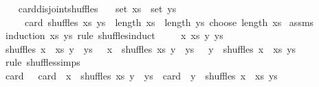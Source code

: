 \begin{isabellebody}
\ \ \isamarkupfalse%
\isanewline
{}\isamarkupfalse%
%
\endisatagproof
{\isafoldproof}%
%
\isadelimproof
\isanewline
%
\endisadelimproof
\isanewline
{}\isamarkupfalse%
\ card{\isacharunderscore}{\kern0pt}disjoint{\isacharunderscore}{\kern0pt}shuffles{\isacharcolon}{\kern0pt}\isanewline
\ \ \ {\isachardoublequoteopen}set\ xs\ {\isasyminter}\ set\ ys\ {\isacharequal}{\kern0pt}\ {\isacharbraceleft}{\kern0pt}{\isacharbraceright}{\kern0pt}{\isachardoublequoteclose}\isanewline
\ \ \ \ \ {\isachardoublequoteopen}card\ {\isacharparenleft}{\kern0pt}shuffles\ xs\ ys{\isacharparenright}{\kern0pt}\ {\isacharequal}{\kern0pt}\ {\isacharparenleft}{\kern0pt}length\ xs\ {\isacharplus}{\kern0pt}\ length\ ys{\isacharparenright}{\kern0pt}\ choose\ length\ xs{\isachardoublequoteclose}\isanewline
%
\isadelimproof
%
\endisadelimproof
%
\isatagproof
{}\isamarkupfalse%
\ assms\isanewline
{}\isamarkupfalse%
\ {\isacharparenleft}{\kern0pt}induction\ xs\ ys\ rule{\isacharcolon}{\kern0pt}\ shuffles{\isachardot}{\kern0pt}induct{\isacharparenright}{\kern0pt}\isanewline
\ \ \isamarkupfalse%
\ {\isacharparenleft}{\kern0pt}{}\ x\ xs\ y\ ys{\isacharparenright}{\kern0pt}\isanewline
\ \ \isamarkupfalse%
\ {\isachardoublequoteopen}shuffles\ {\isacharparenleft}{\kern0pt}x\ {\isacharhash}{\kern0pt}\ xs{\isacharparenright}{\kern0pt}\ {\isacharparenleft}{\kern0pt}y\ {\isacharhash}{\kern0pt}\ ys{\isacharparenright}{\kern0pt}\ {\isacharequal}{\kern0pt}\ {\isacharparenleft}{\kern0pt}{\isacharhash}{\kern0pt}{\isacharparenright}{\kern0pt}\ x\ {\isacharbackquote}{\kern0pt}\ shuffles\ xs\ {\isacharparenleft}{\kern0pt}y\ {\isacharhash}{\kern0pt}\ ys{\isacharparenright}{\kern0pt}\ {\isasymunion}\ {\isacharparenleft}{\kern0pt}{\isacharhash}{\kern0pt}{\isacharparenright}{\kern0pt}\ y\ {\isacharbackquote}{\kern0pt}\ shuffles\ {\isacharparenleft}{\kern0pt}x\ {\isacharhash}{\kern0pt}\ xs{\isacharparenright}{\kern0pt}\ ys{\isachardoublequoteclose}\isanewline
\ \ \ \ \isamarkupfalse%
\ {\isacharparenleft}{\kern0pt}rule\ shuffles{\isachardot}{\kern0pt}simps{\isacharparenright}{\kern0pt}\isanewline
\ \ \isamarkupfalse%
\ \isamarkupfalse%
\ {\isachardoublequoteopen}card\ {\isasymdots}\ {\isacharequal}{\kern0pt}\ card\ {\isacharparenleft}{\kern0pt}{\isacharparenleft}{\kern0pt}{\isacharhash}{\kern0pt}{\isacharparenright}{\kern0pt}\ x\ {\isacharbackquote}{\kern0pt}\ shuffles\ xs\ {\isacharparenleft}{\kern0pt}y\ {\isacharhash}{\kern0pt}\ ys{\isacharparenright}{\kern0pt}{\isacharparenright}{\kern0pt}\ {\isacharplus}{\kern0pt}\ card\ {\isacharparenleft}{\kern0pt}{\isacharparenleft}{\kern0pt}{\isacharhash}{\kern0pt}{\isacharparenright}{\kern0pt}\ y\ {\isacharbackquote}{\kern0pt}\ shuffles\ {\isacharparenleft}{\kern0pt}x\ {\isacharhash}{\kern0pt}\ xs{\isacharparenright}{\kern0pt}\ ys{\isacharparenright}{\kern0pt}{\isachardoublequoteclose}\isanewline

\end{isabellebody}
